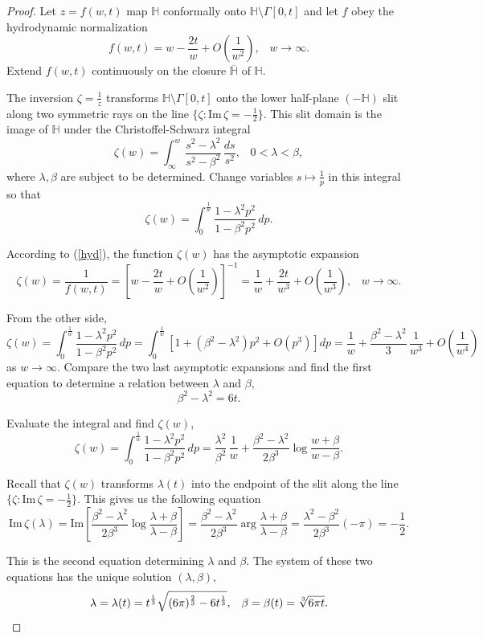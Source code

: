 \documentclass[
11pt,%
tightenlines,%
twoside,%
onecolumn,%
nofloats,%
nobibnotes,%
nofootinbib,%
superscriptaddress,%
noshowpacs,%
centertags]%
{revtex4}
\begin{document}
\begin{proof}
Let $z=f(w,t)$ map $\mathbb H$ conformally onto $\mathbb H\setminus\Gamma[0,t]$ and let $f$ obey the hydrodynamic normalization
\begin{equation}
f(w,t)=w-\frac{2t}{w}+O\left(\frac{1}{w^2}\right),\;\;\;w\to\infty. \label{hyd}
\end{equation}
Extend $f(w,t)$ continuously on the closure $\overline{\mathbb H}$ of $\mathbb H$.

The inversion $\zeta=\frac{1}{z}$ transforms $\mathbb H\setminus\Gamma[0,t]$ onto the lower half-plane $(-\mathbb H)$ slit along two symmetric rays on the line $\{\zeta:\text{Im}\,\zeta=-\frac{1}{2}\}.$ This slit domain is the image of $\mathbb H$ under the Christoffel-Schwarz integral $$\zeta(w)=\int_{\infty}^w\frac{s^2-\lambda^2}{s^2-\beta^2}\,\frac{ds}{s^2},\;\;\;0<\lambda<\beta,$$ where $\lambda,\beta$ are subject to be determined. Change variables $s\mapsto\frac{1}{p}$ in this integral so that $$\zeta(w)=\int_0^{\frac{1}{w}}\frac{1-\lambda^2p^2}{1-\beta^2p^2}\,dp.$$

According to (\ref{hyd}), the function $\zeta(w)$ has the asymptotic expansion $$\zeta(w)=\frac{1}{f(w,t)}=\left[w-\frac{2t}{w}+O\left(\frac{1}{w^2}\right)\right]^{-1}=\frac{1}{w}+\frac{2t}{w^3}+O\left(\frac{1}{w^3} \right),\;\;\;w\to\infty.$$

From the other side, $$\zeta(w)=\int_0^{\frac{1}{w}}\frac{1-\lambda^2p^2}{1-\beta^2p^2}\,dp=\int_0^{\frac{1}{w}}[1+(\beta^2-\lambda^2)p^2+O(p^3)]dp=\frac{1}{w}+ \frac{\beta^2-\lambda^2}{3}\,\frac{1}{w^3}+O\left(\frac{1}{w^4}\right)$$ as $w\to\infty$. Compare the two last asymptotic expansions and find the first equation to determine a relation between $\lambda$ and $\beta$, $$\beta^2-\lambda^2=6t.$$

Evaluate the integral and find $\zeta(w)$, $$\zeta(w)=\int_0^{\frac{1}{w}}\frac{1-\lambda^2p^2}{1-\beta^2p^2}\,dp=\frac{\lambda^2}{\beta^2}\,\frac{1}{w}+ \frac{\beta^2-\lambda^2}{2\beta^3}\log\frac{w+\beta}{w-\beta}.$$

Recall that $\zeta(w)$ transforms $\lambda(t)$ into the endpoint of the slit along the line $\{\zeta:\text{Im}\,\zeta=-\frac{1}{2}\}$. This gives us the following equation $$\text{Im}\,\zeta(\lambda)=\text{Im}\left[\frac{\beta^2-\lambda^2}{2\beta^3}\log\frac{\lambda+\beta}{\lambda-\beta}\right]= \frac{\beta^2-\lambda^2}{2\beta^3}\arg\frac{\lambda+\beta}{\lambda-\beta}=\frac{\lambda^2-\beta^2}{2\beta^3}(-\pi)=-\frac{1}{2}.$$

This is the second equation determining $\lambda$ and $\beta$. The system of these two equations has the unique solution $(\lambda,\beta)$,
$$\lambda=\lambda(t)=t^{\frac{1}{3}}\sqrt{(6\pi)^{\frac{2}{3}}-6t^{\frac{1}{3}}},\;\;\;\beta=\beta(t)=\root3\of{6\pi t}.$$


\end{proof}
\end{document}

